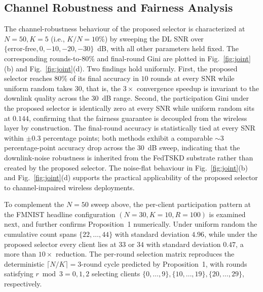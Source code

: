 \documentclass[journal]{IEEEtran}
\newcommand{\revIVE}[1]{#1}
\begin{document}
\subsection{Channel Robustness and Fairness Analysis}
\label{ssec:exp-channel}
The channel-robustness behaviour of the proposed selector is characterized at $N = 50, K = 5$ (i.e., $K/N = 10\%$) by sweeping the DL SNR over $\{\text{error-free}, 0, -10, -20, -30\}$~dB, with all other parameters held fixed. The corresponding rounds-to-$80\%$ and final-round Gini are plotted in Fig.~\ref{fig:joint}(b) and Fig.~\ref{fig:joint}(d). Two findings hold uniformly. First, the proposed selector reaches $80\%$ of its final accuracy in $10$ rounds at every SNR while uniform random takes $30$, that is, the $3\times$ convergence speedup is invariant to the downlink quality across the $30$~dB range. Second, the participation Gini under the proposed selector is identically zero at every SNR while uniform random sits at $0.144$, confirming that the fairness guarantee is decoupled from the wireless layer by construction. The final-round accuracy is statistically tied at every SNR within $\pm 0.3$ percentage points; both methods exhibit a comparable $\sim 3$ percentage-point accuracy drop across the $30$~dB sweep, indicating that the downlink-noise robustness is inherited from the FedTSKD substrate \cite{mu2024fedtskd} rather than created by the proposed selector. The noise-flat behaviour in Fig.~\ref{fig:joint}(b) and Fig.~\ref{fig:joint}(d) supports the practical applicability of the proposed selector to channel-impaired wireless deployments.

\revIVE{To complement the $N=50$ sweep above, the per-client participation pattern at the FMNIST headline configuration $(N = 30, K = 10, R = 100)$ is examined next, and further confirms Proposition~1 numerically.} Under uniform random the cumulative count spans $\{22, \dots, 44\}$ with standard deviation $4.96$, while under the proposed selector every client lies at $33$ or $34$ with standard deviation $0.47$, a more than $10\times$ reduction. The per-round selection matrix reproduces the deterministic $\lceil N/K \rceil = 3$-round cycle predicted by Proposition~1, with rounds satisfying $r \bmod 3 = 0, 1, 2$ selecting clients $\{0,\dots,9\}, \{10,\dots,19\}, \{20,\dots,29\}$, respectively.
\end{document}
